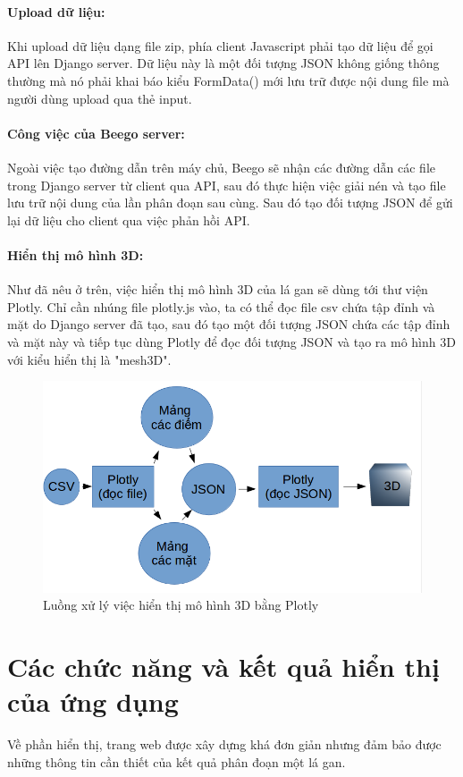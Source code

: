 \paragraph{Upload dữ liệu:} Khi upload dữ liệu dạng file zip, phía client Javascript phải tạo dữ liệu để gọi API lên Django server. Dữ liệu này là một đối tượng JSON không giống thông thường mà nó phải khai báo kiểu FormData() mới lưu trữ được nội dung file mà người dùng upload qua thẻ input.\\
\paragraph{Công việc của Beego server:} Ngoài việc tạo đường dẫn trên máy chủ, Beego sẽ nhận các đường dẫn các file trong Django server từ client qua API, sau đó thực hiện việc giải nén và tạo file lưu trữ nội dung của lần phân đoạn sau cùng. Sau đó tạo đối tượng JSON để gửi lại dữ liệu cho client qua việc phản hồi API.
\paragraph{Hiển thị mô hình 3D:} Như đã nêu ở trên, việc hiển thị mô hình 3D của lá gan sẽ dùng tới thư viện Plotly. Chỉ cần nhúng file plotly.js vào, ta có thể đọc file csv chứa tập đỉnh và mặt do Django server đã tạo, sau đó tạo một đối tượng JSON chứa các tập đỉnh và mặt này và tiếp tục dùng Plotly để đọc đối tượng JSON và tạo ra mô hình 3D với kiểu hiển thị là "mesh3D".

\begin{figure}[h]
\centering
    \includegraphics[totalheight=7cm]{Images/app_show3d.png}
    \caption{Luồng xử lý việc hiển thị mô hình 3D bằng Plotly}
    \label{skip_conn}
\end{figure}

\section{Các chức năng và kết quả hiển thị của ứng dụng}
Về phần hiển thị, trang web được xây dựng khá đơn giản nhưng đảm bảo được những thông tin cần thiết của kết quả phân đoạn một lá gan.
